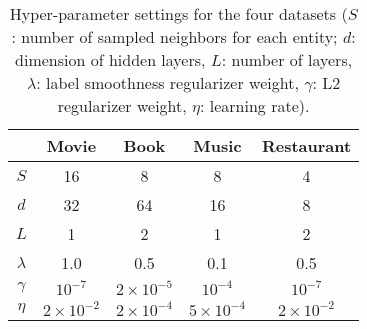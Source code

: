 \documentclass[sigconf]{acmart}
\begin{document}
		\begin{table}[t]
			\centering
			\begin{tabular}{c|cccc}
				\hline
				& Movie & Book & Music & Restaurant\\
				\hline
				$S$ & 16 & 8 & 8 & 4\\
				$d$ & 32 & 64 & 16 & 8\\
				$L$ & 1 & 2 & 1 & 2\\
				$\lambda$ & 1.0 & 0.5 & 0.1 & 0.5 \\
				$\gamma$ & $10^{-7}$ & $2 \times 10^{-5}$ & $10^{-4}$ & $10^{-7}$\\
				$\eta$ & $2 \times 10^{-2}$ & $2 \times 10^{-4}$ & $5 \times 10^{-4}$ & $2 \times 10^{-2}$\\
				\hline
			\end{tabular}
			\vspace{0.05in}
			\caption{Hyper-parameter settings for the four datasets ($S$: number of sampled neighbors for each entity; $d$: dimension of hidden layers, $L$: number of layers, $\lambda$: label smoothness regularizer weight, $\gamma$: L2 regularizer weight, $\eta$: learning rate).}
			\label{table:hp}
			\vspace{-0.2in}
		\end{table}
\end{document}
